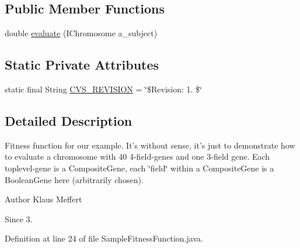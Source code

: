 \subsection*{Public Member Functions}
\begin{DoxyCompactItemize}
\item 
double \hyperlink{classexamples_1_1distinct_genes_1_1_sample_fitness_function_a6503a45b7bd3440d3f238bfb0891c493}{evaluate} (I\-Chromosome a\-\_\-subject)
\end{DoxyCompactItemize}
\subsection*{Static Private Attributes}
\begin{DoxyCompactItemize}
\item 
static final String \hyperlink{classexamples_1_1distinct_genes_1_1_sample_fitness_function_ad2d3ad84bb4bc16043e9f1c105e4b889}{C\-V\-S\-\_\-\-R\-E\-V\-I\-S\-I\-O\-N} = \char`\"{}\$Revision\-: 1. \$\char`\"{}
\end{DoxyCompactItemize}


\subsection{Detailed Description}
Fitness function for our example. It's without sense, it's just to demonstrate how to evaluate a chromosome with 40 4-\/field-\/genes and one 3-\/field gene. Each toplevel-\/gene is a Composite\-Gene, each \char`\"{}field\char`\"{} within a Composite\-Gene is a Boolean\-Gene here (arbitrarily chosen).

\begin{DoxyAuthor}{Author}
Klaus Meffert 
\end{DoxyAuthor}
\begin{DoxySince}{Since}
3. 
\end{DoxySince}


Definition at line 24 of file Sample\-Fitness\-Function.\-java.



